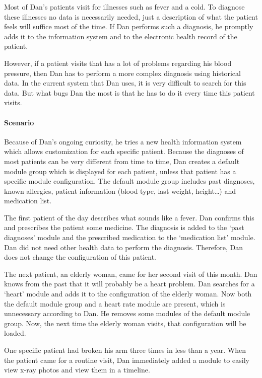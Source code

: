         Most of Dan's patients visit for illnesses such as fever and a cold. To diagnose these illnesses no data is necessarily needed, just a description of what the patient feels will suffice most of the time. If Dan performs such a diagnosis, he promptly adds it to the information system and to the electronic health record of the patient.

        However, if a patient visits that has a lot of problems regarding his blood pressure, then Dan has to perform a more complex diagnosis using historical data. In the current system that Dan uses, it is very difficult to search for this data. But what bugs Dan the most is that he has to do it every time this patient visits.

        \paragraph{Scenario} Because of Dan's ongoing curiosity, he tries a new health information system which allows customization for each specific patient. Because the diagnoses of most patients can be very different from time to time, Dan creates a default module group which is displayed for each patient, unless that patient has a specific module configuration. The default module group includes past diagnoses, known allergies, patient information (blood type, last weight, height\ldots) and medication list.

        The first patient of the day describes what sounds like a fever. Dan confirms this and prescribes the patient some medicine. The diagnosis is added to the `past diagnoses' module and the prescribed medication to the `medication list' module. Dan did not need other health data to perform the diagnosis. Therefore, Dan does not change the configuration of this patient.

        The next patient, an elderly woman, came for her second visit of this month. Dan knows from the past that it will probably be a heart problem. Dan searches for a `heart' module and adds it to the configuration of the elderly woman. Now both the default module group and a heart rate module are present, which is unnecessary according to Dan. He removes some modules of the default module group. Now, the next time the elderly woman visits, that configuration will be loaded.

        One specific patient had broken his arm three times in less than a year. When the patient came for a routine visit, Dan immediately added a module to easily view x-ray photos and view them in a timeline.\\

